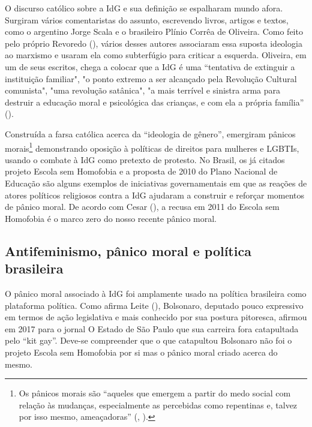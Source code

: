 \documentclass[
	12pt,				%
	openright,			%
	twoside,			%
	a4paper,			%
	english,			%
	brazil				%
	]{abntex2}
\begin{document}
 O discurso católico sobre a IdG e sua definição se espalharam mundo afora. Surgiram vários comentaristas do assunto, escrevendo livros, artigos e textos, como o argentino Jorge Scala e o brasileiro Plínio Corrêa de Oliveira. Como feito pelo próprio Revoredo (\citeyear{revoredo1998}), vários desses autores associaram essa suposta ideologia ao marxismo e usaram ela como subterfúgio para criticar a esquerda. Oliveira, em um de seus escritos, chega a colocar que a IdG é uma “tentativa de extinguir a instituição familiar", "o ponto extremo a ser alcançado pela Revolução Cultural comunista", "uma revolução satânica", "a mais terrível e sinistra arma para destruir a educação moral e psicológica das crianças, e com ela a própria família” (\citeyear{silva2018}).

 Construída a farsa católica acerca da “ideologia de gênero”, emergiram pânicos morais\footnote{Os pânicos morais são “aqueles que emergem a partir do medo social com relação às mudanças, especialmente as percebidas como repentinas e, talvez por isso mesmo, ameaçadoras” (, \citeyear{miskolci2007}).} demonstrando oposição à políticas de direitos para mulheres e LGBTIs, usando o combate à IdG como pretexto de protesto. No Brasil, os já citados projeto Escola sem Homofobia e a proposta de 2010 do Plano Nacional de Educação são alguns exemplos de iniciativas governamentais em que as reações de atores políticos religiosos contra a IdG ajudaram a construir e reforçar momentos de pânico moral. De acordo com Cesar (\citeyear{cesar2017}), a recusa em 2011 do Escola sem Homofobia é o marco zero do nosso recente pânico moral.

 \subsection{Antifeminismo, pânico moral e política brasileira}
 O pânico moral associado à IdG foi amplamente usado na política brasileira como plataforma política. Como afirma Leite (\citeyear{leite2019}), Bolsonaro, deputado pouco expressivo em termos de ação legislativa e mais conhecido por sua postura pitoresca, afirmou em 2017 para o jornal O Estado de São Paulo que sua carreira fora catapultada pelo “kit gay”. Deve-se compreender que o que catapultou Bolsonaro não foi o projeto Escola sem Homofobia por si mas o pânico moral criado acerca do mesmo. 
\end{document}
